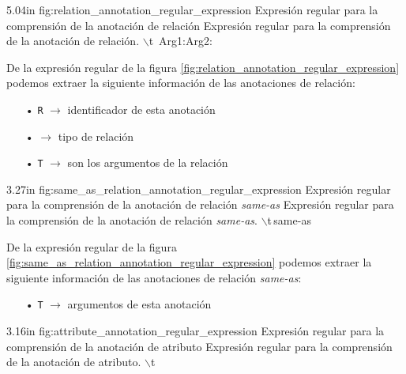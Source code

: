 \begin{annexample}
[backgroundcolor=white]
{5.04in}
{fig:relation_annotation_regular_expression}
{Expresión regular para la comprensión de la anotación de relación}
{Expresión regular para la comprensión de la anotación de relación.}
	\ttfamily
	\StartingRegex{}$\backslash$t\, Arg1:\space Arg2:\EndingRegex
\end{annexample}

De la expresión regular de la figura \ref{fig:relation_annotation_regular_expression} podemos extraer la siguiente información de las anotaciones de relación:
\begin{itemize}
	\item[•] \texttt{R\OneOrMoreRegex} $\longrightarrow$ identificador de esta anotación
	\item[•] {\tt{}\OneOrMoreRegex} $\longrightarrow$ tipo de relación
	\item[•] \texttt{T\OneOrMoreRegex} $\longrightarrow$ son los argumentos de la relación
\end{itemize}

\begin{annexample}
[backgroundcolor=white]
{3.27in}
{fig:same_as_relation_annotation_regular_expression}
{Expresión regular para la comprensión de la anotación de relación \textit{same-as}}
{Expresión regular para la comprensión de la anotación de relación \textit{same-as}.}
	\ttfamily
	\StartingRegex*$\backslash$t\,same-as \OneOrMoreRegex\EndingRegex
\end{annexample}

De la expresión regular de la figura \ref{fig:same_as_relation_annotation_regular_expression} podemos extraer la siguiente información de las anotaciones de relación \textit{same-as}:
\begin{itemize}
	\item[•] \texttt{T\OneOrMoreRegex} $\longrightarrow$ argumentos de esta anotación
\end{itemize}

\begin{annexample}
[backgroundcolor=white]
{3.16in}
{fig:attribute_annotation_regular_expression}
{Expresión regular para la comprensión de la anotación de atributo}
{Expresión regular para la comprensión de la anotación de atributo.}
	\StartingRegex{}$\backslash$t \EndingRegex
\end{annexample}

